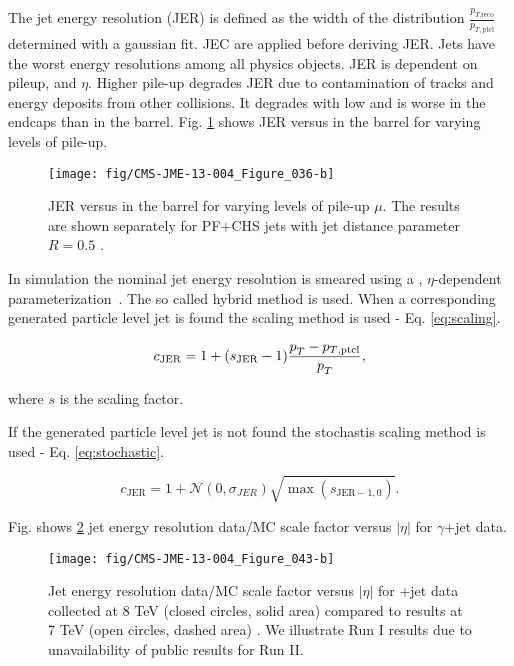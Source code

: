 \begin{description}
The jet energy resolution (JER) is defined as the width of the distribution $\frac{p_{T\text{,reco}}}{p_{T,\text{ptcl}}}$ determined with a gaussian fit. JEC are applied before deriving JER. Jets have the worst energy resolutions among all physics objects. JER is dependent on pileup, \pt and $\eta$. Higher pile-up degrades JER due to contamination of tracks and energy deposits from other collisions. It degrades with low \pt and is worse in the endcaps than in the barrel. Fig. \ref{fig:JER} shows JER versus \pt in the barrel for varying levels of pile-up.

\begin{figure}[htp]
\centering
  \def\twidth{0.45}
  \centering
    \texttt{[image: fig/CMS-JME-13-004\_Figure\_036-b]}
\caption{JER versus \pt in the barrel for varying levels of pile-up $\mu$. The results are shown separately for PF+CHS jets with jet distance parameter $R=0.5$ \cite{Khachatryan:2016kdb}.}
\label{fig:JER}
\end{figure}

In simulation the nominal jet energy resolution is smeared using a \pt, $\eta$-dependent parameterization~\cite{twiki:JER}. The so called hybrid method is used. When a corresponding generated particle level jet is found the scaling method is used - Eq. \ref{eq:scaling}.

\begin{equation}
c_{\text{JER}}=1 + (s_{\text{JER}}-1)\frac{p_{T}^{}-p_{T\text{,ptcl}}}{p_{T}^{}},
\label{eq:scaling}
\end{equation}

where $s$ is the scaling factor.

If the generated particle level jet is not found the stochastis scaling method is used - Eq. \ref{eq:stochastic}.

\begin{equation}
c_{\text{JER}}=1+\mathcal{N}(0,\sigma_{JER})\sqrt{\max(s_{\text{JER}-1,0})}.
\label{eq:stochastic}
\end{equation}

Fig. shows \ref{fig:CMS-JME-13-004_Figure_041} jet energy resolution data/MC scale factor versus $\left|\eta\right|$ for $\gamma$+jet data.

\begin{figure}[htp]
\centering
  \def\twidth{0.45}
  \centering
    \texttt{[image: fig/CMS-JME-13-004\_Figure\_043-b]}
  \caption{Jet energy resolution data/MC scale factor versus $\left|\eta\right|$ for \cPgg+jet data collected at 8 TeV (closed circles, solid area) compared to results at 7 TeV (open circles, dashed area) \cite{Khachatryan:2016kdb}. We illustrate Run I results due to unavailability of public results for Run II.}
  \label{fig:CMS-JME-13-004_Figure_041}
\end{figure}


\end{description}
